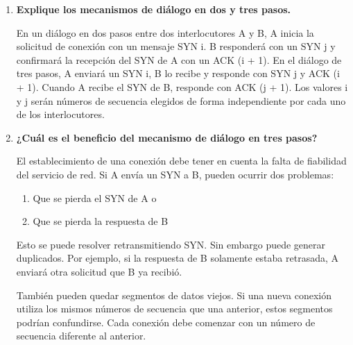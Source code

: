 \documentclass[11pt,a4paper]{article}
\begin{document}
\begin{enumerate}[label=20.\arabic*, start=1, itemsep=0.3cm]
  En el esquema de ventana deslizante, la confirmación o ACK de la llegada de datos habilita al emisor inmediatamente a enviar más datos. En cambio, en el sistema de créditos se puede dar el ACK de que los datos llegaron, pero la habilitación para enviar más datos es independiente. Por lo tanto, el emisor puede recibir la confirmación de la llegada de los datos, pero no tener permitido enviar más hasta recibir créditos adicionales para continuar la comunicación.

  \item \textbf{Explique los mecanismos de diálogo en dos y tres pasos.}

  En un diálogo en dos pasos entre dos interlocutores A y B, A inicia la solicitud de conexión con un mensaje SYN i. B responderá con un SYN j y confirmará la recepción del SYN de A con un ACK (i + 1). En el diálogo de tres pasos, A enviará un SYN i, B lo recibe y responde con SYN j y ACK (i + 1). Cuando A recibe el SYN de B, responde con ACK (j + 1). Los valores i y j serán números de secuencia elegidos de forma independiente por cada uno de los interlocutores.

  \item \textbf{¿Cuál es el beneficio del mecanismo de diálogo en tres pasos?}

  El establecimiento de una conexión debe tener en cuenta la falta de fiabilidad del servicio de red. Si A envía un SYN a B, pueden ocurrir dos problemas:
  \begin{enumerate}
    \item Que se pierda el SYN de A o
    \item Que se pierda la respuesta de B
  \end{enumerate}
  Esto se puede resolver retransmitiendo SYN. Sin embargo puede generar duplicados. Por ejemplo, si la respuesta de B solamente estaba retrasada, A enviará otra solicitud que B ya recibió.

  También pueden quedar segmentos de datos viejos. Si una nueva conexión utiliza los mismos números de secuencia que una anterior, estos segmentos podrían confundirse. Cada conexión debe comenzar con un número de secuencia diferente al anterior.


\end{enumerate}
\end{document}
